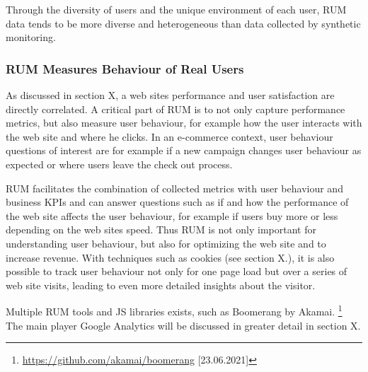 Through the diversity of users and the unique environment of each user,  RUM data tends to be more diverse and heterogeneous than data collected by synthetic monitoring. %



\subsubsection{RUM Measures Behaviour of Real Users}



As discussed in section X, a web sites performance and user satisfaction are directly correlated.
A critical part of RUM is to not only capture performance metrics, but also measure user behaviour, for example how the user interacts with the web site and where he clicks. %
In an e-commerce context, user behaviour questions of interest are for example if a new campaign changes user behaviour as expected or where users leave the check out process. %

RUM facilitates the combination of collected metrics with user behaviour and business KPIs and can answer questions such as if and how the performance of the web site affects the user behaviour, for example if users buy more or less depending on the web sites speed.%
Thus RUM is not only important for understanding user behaviour, but also for optimizing the web site and to increase revenue.
With techniques such as cookies (see section X.), it is also possible to track user behaviour not only for one page load but over a series of web site visits, leading to even more detailed insights about the visitor. %



Multiple RUM tools and JS libraries exists, such as Boomerang by Akamai. \footnote{\url{https://github.com/akamai/boomerang} [23.06.2021]}
The main player Google Analytics will be discussed in greater detail in section X.



